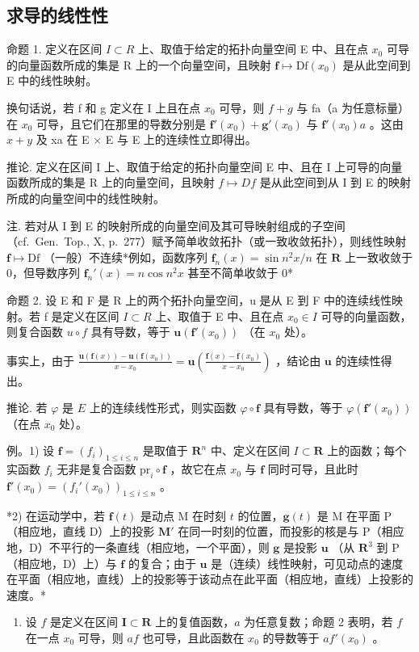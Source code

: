 \subsection{求导的线性性}

命题 1. 定义在区间 \(I \subset R\) 上、取值于给定的拓扑向量空间 E 中、且在点 \(x_{0}\) 可导的向量函数所成的集是 R 上的一个向量空间，且映射 \(\mathbf{f} \mapsto \mathrm{Df}(x_{0})\) 是从此空间到 E 中的线性映射。

换句话说，若 f 和 g 定义在 I 上且在点 \(x_{0}\) 可导，则 \(f + g\) 与 fa（a 为任意标量）在 \(x_{0}\) 可导，且它们在那里的导数分别是 \(\mathbf{f}'(x_{0}) + \mathbf{g}'(x_{0})\) 与 \(\mathbf{f}'(x_{0})a\) 。这由 \(x + y\) 及 xa 在 E × E 与 E 上的连续性立即得出。

推论. 定义在区间 I 上、取值于给定的拓扑向量空间 E 中、且在 I 上可导的向量函数所成的集是 R 上的向量空间，且映射 \(f \mapsto Df\) 是从此空间到从 I 到 E 的映射所成的向量空间中的线性映射。

注. 若对从 I 到 E 的映射所成的向量空间及其可导映射组成的子空间（cf.~Gen.~Top., X, p.~277）赋予简单收敛拓扑（或一致收敛拓扑），则线性映射 \(\mathbf{f} \mapsto \mathrm{Df}\) （一般）不连续*例如，函数序列 \(\mathbf{f}_n(x) = \sin n^2 x / n\) 在 \(\mathbf{R}\) 上一致收敛于 0，但导数序列 \(\mathbf{f}_n'(x) = n\cos n^2 x\) 甚至不简单收敛于 \(0\)*

命题 2. 设 E 和 F 是 R 上的两个拓扑向量空间，u 是从 E 到 F 中的连续线性映射。若 f 是定义在区间 \(I \subset R\) 上、取值于 E 中、且在点 \(x_{0} \in I\) 可导的向量函数，则复合函数 \(u \circ f\) 具有导数，等于 \(\mathbf{u}(\mathbf{f}'(x_{0}))\) （在 \(x_{0}\) 处）。

事实上，由于 \(\frac{\mathbf{u}(\mathbf{f}(x)) - \mathbf{u}(\mathbf{f}(x_0))}{x - x_0} = \mathbf{u}\left(\frac{\mathbf{f}(x) - \mathbf{f}(x_0)}{x - x_0}\right)\) ，结论由 \(\mathbf{u}\) 的连续性得出。

推论. 若 \(\varphi\) 是 \(E\) 上的连续线性形式，则实函数 \(\varphi \circ \mathbf{f}\) 具有导数，等于 \(\varphi(\mathbf{f}'(x_0))\) （在点 \(x_0\) 处）。

例。1) 设 \(\mathbf{f} = (f_i)_{1\leqslant i\leqslant n}\) 是取值于 \(\mathbf{R}^n\) 中、定义在区间 \(I\subset \mathbf{R}\) 上的函数；每个实函数 \(f_{i}\) 无非是复合函数 \(\mathrm{pr}_i\circ \mathbf{f}\) ，故它在点 \(x_0\) 与 \(\mathbf{f}\) 同时可导，且此时 \(\mathbf{f}'(x_0) = (f_i'(x_0))_{1\leqslant i\leqslant n}\) 。

*2) 在运动学中，若 \(\mathbf{f}(t)\) 是动点 M 在时刻 \(t\) 的位置，\(\mathbf{g}(t)\) 是 M 在平面 P（相应地，直线 D）上的投影 \(\mathbf{M}'\) 在同一时刻的位置，而投影的核是与 P（相应地，D）不平行的一条直线（相应地，一个平面），则 \(\mathbf{g}\) 是投影 \(\mathbf{u}\) （从 \(\mathbf{R}^3\) 到 P（相应地，D）上）与 \(\mathbf{f}\) 的复合；由于 \(\mathbf{u}\) 是（连续）线性映射，可见动点的速度在平面（相应地，直线）上的投影等于该动点在此平面（相应地，直线）上投影的速度。*

\begin{enumerate}
\def\labelenumi{\arabic{enumi})}
\setcounter{enumi}{2}
\tightlist
\item
  设 \(f\) 是定义在区间 \(\mathbf{I} \subset \mathbf{R}\) 上的复值函数，\(a\) 为任意复数；命题 2 表明，若 \(f\) 在一点 \(x_0\) 可导，则 \(af\) 也可导，且此函数在 \(x_0\) 的导数等于 \(af'(x_0)\) 。
\end{enumerate}

